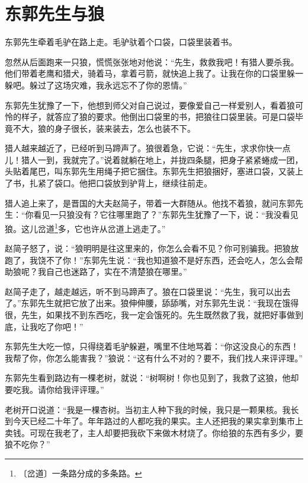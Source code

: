 \documentclass[12pt,UTF-8,openany]{ctexbook}
\begin{document}
\chapter{东郭先生与狼}

\begin{Large}
    
    东郭先生牵着毛驴在路上走。毛驴驮着个口袋，口袋里装着书。
    
    忽然从后面跑来一只狼，慌慌张张地对他说：“先生，救救我吧！有猎人要杀我。他们带着老鹰和猎犬，骑着马，拿着弓箭，就快追上我了。让我在你的口袋里躲一躲吧。躲过了这场灾难，我永远忘不了你的恩情。”
    
    东郭先生犹豫了一下，他想到师父对自己说过，要像爱自己一样爱别人，看着狼可怜的样子，就答应了狼的要求。他倒出口袋里的书，把狼往口袋里装。可是口袋毕竟不大，狼的身子很长，装来装去，怎么也装不下。
    
    猎人越来越近了，已经听到马蹄声了。狼很着急，它说：“先生，求求你快一点儿！猎人一到，我就完了。”说着就躺在地上，并拢四条腿，把身子紧紧蜷成一团，头贴着尾巴，叫东郭先生用绳子把它捆住。东郭先生把狼捆好，塞进口袋，又装上了书，扎紧了袋口。他把口袋放到驴背上，继续往前走。
    
    猎人追上来了，是晋国的大夫赵简子，带着一大群随从。他找不着狼，就问东郭先生：“你看见一只狼没有？它往哪里跑了？”东郭先生犹豫了一下，说：“我没看见狼。这儿岔道\footnote{〔岔道〕一条路分成的多条路。}多，它也许从岔道上逃走了。”
    
    赵简子怒了，说：“狼明明是往这里来的，你怎么会看不见？你可别骗我。把狼放跑了，我饶不了你！”东郭先生说：“我也知道狼不是好东西，还会吃人，怎么会帮助狼呢？我自己也迷路了，实在不清楚狼在哪里。”
    
    赵简子走了，越走越远，听不到马蹄声了。狼在口袋里说：“先生，我可以出去了。”东郭先生就把它放了出来。狼伸伸腰，舔舔嘴，对东郭先生说：“我现在饿得很，先生，如果找不到东西吃，我一定会饿死的。先生既然救了我，就把好事做到底，让我吃了你吧！”
    
    东郭先生大吃一惊，只得绕着毛驴躲避，嘴里不住地骂着：“你这没良心的东西！我帮了你，你怎么能害我？”狼说：“这有什么不对的？要不，我们找人来评评理。”
    
    东郭先生看到路边有一棵老树，就说：“树啊树！你也见到了，我救了这狼，他却要吃我。请你给我评评理。”
    
    老树开口说道：“我是一棵杏树。当初主人种下我的时候，我只是一颗果核。我长到今天已经二十年了。年年路过的人都吃我的果实。主人还把我的果实拿到集市上卖钱。可现在我老了，主人却要把我砍下来做木材烧了。你给狼的东西有多少，要狼不吃你？”
    

\end{Large}
\end{document}
